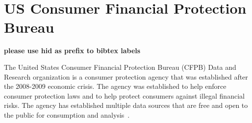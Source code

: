 \section{US Consumer Financial Protection Bureau}

{\bf please use  hid as prefix to bibtex labels}

The United States Consumer Financial Protection Bureau (CFPB) Data and Research
organization is a consumer protection agency that was established after the
2008-2009 economic crisis.  The agency was established to help enforce consumer
protection laws and to help protect consumers against illegal financial risks.
The agency has established multiple data sources that are free and open to the
public for consumption and analysis~\cite{CFPB2018}.
